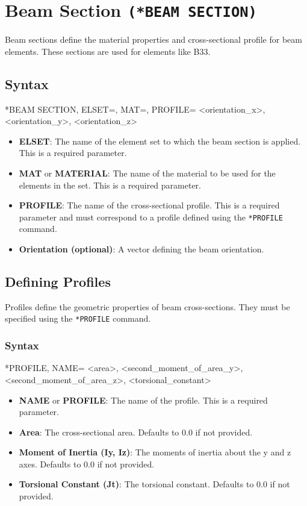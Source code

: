 \section{Beam Section \texttt{(*BEAM SECTION)}}
Beam sections define the material properties and cross-sectional profile for beam elements. These sections are used for elements like B33.

\subsection{Syntax}
\begin{codeBlock}
*BEAM SECTION, ELSET=, MAT=, PROFILE=
<orientation_x>, <orientation_y>, <orientation_z>
\end{codeBlock}

\begin{itemize}
\item \textbf{ELSET}: The name of the element set to which the beam section is applied. This is a required parameter.
\item \textbf{MAT} or \textbf{MATERIAL}: The name of the material to be used for the elements in the set. This is a required parameter.
\item \textbf{PROFILE}: The name of the cross-sectional profile. This is a required parameter and must correspond to a profile defined using the \texttt{*PROFILE} command.
\item \textbf{Orientation (optional)}: A vector  defining the beam orientation.
\end{itemize}

\subsection{Defining Profiles}
Profiles define the geometric properties of beam cross-sections. They must be specified using the \texttt{*PROFILE} command.

\subsubsection{Syntax}
\begin{codeBlock}
*PROFILE, NAME=
<area>, <second_moment_of_area_y>, <second_moment_of_area_z>, <torsional_constant>
\end{codeBlock}

\begin{itemize}
\item \textbf{NAME} or \textbf{PROFILE}: The name of the profile. This is a required parameter.
\item \textbf{Area}: The cross-sectional area. Defaults to 0.0 if not provided.
\item \textbf{Moment of Inertia (Iy, Iz)}: The moments of inertia about the y and z axes. Defaults to 0.0 if not provided.
\item \textbf{Torsional Constant (Jt)}: The torsional constant. Defaults to 0.0 if not provided.
\end{itemize}




